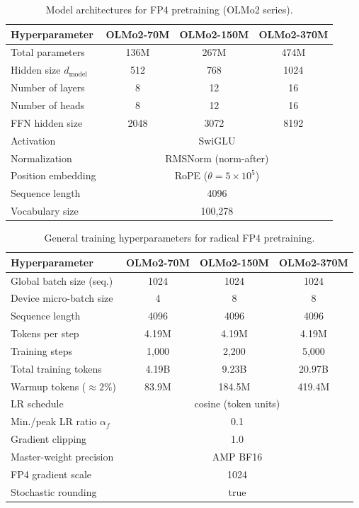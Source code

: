 \documentclass{article}
\begin{document}
\begin{table}[t]
\centering
\caption{Model architectures for FP4 pretraining (OLMo2 series).\label{tab:fp4-arch}}
\begin{tabular}{lccc}
\toprule
\textbf{Hyperparameter} & \textbf{OLMo2-70M} & \textbf{OLMo2-150M} & \textbf{OLMo2-370M} \\
\midrule
Total parameters       & 136M & 267M & 474M \\
Hidden size $d_\text{model}$ & 512 & 768 & 1024 \\
Number of layers       & 8 & 12 & 16 \\
Number of heads        & 8 & 12 & 16 \\
FFN hidden size        & 2048 & 3072 & 8192 \\
Activation             & \multicolumn{3}{c}{SwiGLU} \\
Normalization          & \multicolumn{3}{c}{RMSNorm (norm-after)} \\
Position embedding     & \multicolumn{3}{c}{RoPE ($\theta=5\times10^{5}$)} \\
Sequence length        & \multicolumn{3}{c}{4096} \\
Vocabulary size        & \multicolumn{3}{c}{100{,}278} \\
\bottomrule
\end{tabular}
\end{table}

\begin{table}[t]
\centering
\caption{General training hyperparameters for radical FP4 pretraining.\label{tab:general-hp-olmo}}
\begin{tabular}{lccc}
\toprule
\textbf{Hyperparameter} & \textbf{OLMo2-70M} & \textbf{OLMo2-150M} & \textbf{OLMo2-370M} \\
\midrule
Global batch size (seq.)     & 1024 & 1024 & 1024 \\
Device micro-batch size      & 4 & 8 & 8 \\
Sequence length              & 4096 & 4096 & 4096 \\
Tokens per step              & 4.19M & 4.19M & 4.19M \\
Training steps               & 1{,}000 & 2{,}200 & 5{,}000 \\
Total training tokens        & 4.19B & 9.23B & 20.97B \\
Warmup tokens ($\approx 2\%$) & 83.9M & 184.5M & 419.4M \\
LR schedule                  & \multicolumn{3}{c}{cosine (token units)} \\
Min./peak LR ratio $\alpha_f$ & \multicolumn{3}{c}{0.1} \\
Gradient clipping            & \multicolumn{3}{c}{1.0} \\
Master-weight precision      & \multicolumn{3}{c}{AMP BF16} \\
FP4 gradient scale           & \multicolumn{3}{c}{1024} \\
Stochastic rounding          & \multicolumn{3}{c}{true} \\
\bottomrule
\end{tabular}
\end{table}
\end{document}
